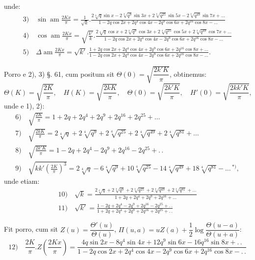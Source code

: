 \documentclass{article}
\begin{document}
unde:
\[
\begin{gathered}
\text{3)}\quad\sin\operatorname{am}\frac{2Kx}{\pi}=\frac{1}{\sqrt{k}}.\frac{2\sqrt[4]{q}\sin x-2\sqrt[4]{q^{9}}\sin 3x+2\sqrt[4]{q^{25}}\sin 5x-2\sqrt[4]{q^{49}}\sin 7x+\ldots}{1-2q\cos 2x+2q^{4}\cos 4x-2q^{9}\cos 6x+2q^{16}\cos 8x-\ldots}\\[2ex]
\text{4)}\quad\cos\operatorname{am}\frac{2Kx}{\pi}=\sqrt{\frac{k'}{k}}.\frac{2\sqrt[4]{q}\cos x+2\sqrt[4]{q^{9}}\cos 3x+2\sqrt[4]{q^{25}}\cos 5x+2\sqrt[4]{q^{49}}\cos 7x+\ldots}{1-2q\cos 2x+2q^{4}\cos 4x-2q^{9}\cos 6x+2q^{16}\cos 8x-\ldots}\\[2ex]
\text{5)}\quad\Delta\operatorname{am}\frac{2Kx}{\pi}=\sqrt{k'}.\frac{1+2q\cos 2x+2q^{4}\cos 4x+2q^{9}\cos 6x+2q^{16}\cos 8x+\ldots}{1-2q\cos 2x+2q^{4}\cos 4x-2q^{9}\cos 6x+2q^{16}\cos 8x-\ldots}.
\end{gathered}
\]

Porro e 2), 3) §. 61, cum positum sit $\Theta(0)=\sqrt{\dfrac{2k'K}{\pi}}$, obtinemus:
\[
\Theta(K)=\sqrt{\frac{2K}{\pi}},\quad H(K)=\sqrt{\frac{2kK}{\pi}},\quad\Theta(0)=\sqrt{\frac{2k'K}{\pi}},\quad H'(0)=\sqrt{\frac{2kk'K}{\pi}},
\]
unde e 1), 2):
\[
\begin{gathered}
\text{6)}\quad\sqrt{\frac{2K}{\pi}}=1+2q+2q^{4}+2q^{9}+2q^{16}+2q^{25}+\ldots\\[2ex]
\text{7)}\quad\sqrt{\frac{2kK}{\pi}}=2\sqrt[4]{q}+2\sqrt[4]{q^{9}}+2\sqrt[4]{q^{25}}+2\sqrt[4]{q^{49}}+2\sqrt[4]{q^{81}}+\ldots\\[2ex]
\text{8)}\quad\sqrt{\frac{2k'K}{\pi}}=1-2q+2q^{4}-2q^{9}+2q^{16}-2q^{25}+.\,.\\[2ex]
\text{9)}\quad\sqrt{kk'\left(\frac{2K}{\pi}\right)^{3}}=2\sqrt[4]{q}-6\sqrt[4]{q^{9}}+10\sqrt[4]{q^{25}}-14\sqrt[4]{q^{49}}+18\sqrt[4]{q^{81}}-\ldots\,{}^{*)},
\end{gathered}
\]
unde etiam:
\[
\begin{gathered}
\text{10)}\quad\sqrt{k}=\frac{2\sqrt[4]{q}+2\sqrt[4]{q^{9}}+2\sqrt[4]{q^{25}}+2\sqrt[4]{q^{49}}+2\sqrt[4]{q^{81}}+\ldots}{1+2q+2q^{4}+2q^{9}+2q^{16}+\ldots}\\[2ex]
\text{11)}\quad\sqrt{k'}=\frac{1-2q+2q^{4}-2q^{9}+2q^{16}-2q^{25}+.\,.}{1+2q+2q^{4}+2q^{9}+2q^{16}+2q^{25}+.\,.}
\end{gathered}
\]

Fit porro, cum sit $Z(u)=\dfrac{\Theta'(u)}{\Theta(u)}$, $\Pi(u,a)=uZ(a)+\dfrac{1}{2}\log\dfrac{\Theta(u-a)}{\Theta(u+a)}$:
\[
\text{12)}\quad\frac{2K}{\pi}.Z\left(\frac{2Kx}{\pi}\right)=\frac{4q\sin 2x-8q^{4}\sin 4x+12q^{9}\sin 6x-16q^{16}\sin 8x+.\,.}{1-2q\cos 2x+2q^{4}\cos 4x-2q^{9}\cos 6x+2q^{16}\cos 8x-.\,.}
\]
\end{document}
